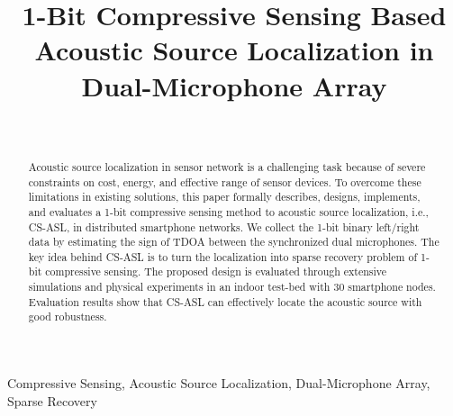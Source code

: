 \documentclass[journal]{IEEEtran}
\begin{document}
\title{1-Bit Compressive Sensing  Based Acoustic Source Localization  in  Dual-Microphone Array}

%
\author{\\
}

\maketitle

\pagestyle{empty}  %
\thispagestyle{empty} %


\begin{abstract}
Acoustic source localization in sensor network is a challenging task because of severe constraints on cost, energy, and effective range of sensor devices.
To overcome these limitations in existing solutions, this paper formally describes, designs, implements, and evaluates a 1-bit compressive sensing method to acoustic source localization, i.e., CS-ASL, in distributed smartphone networks.
We  collect the 1-bit binary left/right data  by estimating the sign of TDOA between the synchronized dual microphones. 
The key idea behind CS-ASL is to turn the localization  into sparse recovery problem of 1-bit  compressive sensing. 
The proposed design is evaluated through extensive simulations and physical experiments in an indoor test-bed with 30 smartphone nodes. Evaluation results show that CS-ASL  can effectively locate the acoustic source with good robustness.



\end{abstract}

\begin{IEEEkeywords}
Compressive Sensing, Acoustic Source Localization,  Dual-Microphone Array, Sparse Recovery
\end{IEEEkeywords}



\IEEEpeerreviewmaketitle



%

%





\end{document}
